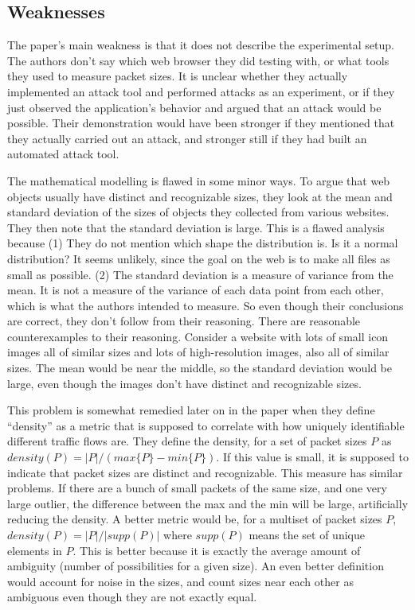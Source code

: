 \documentclass{acm_proc_article-sp}
\begin{document}
\subsection{Weaknesses}

The paper's main weakness is that it does not describe the experimental setup.
The authors don't say which web browser they did testing with, or what tools
they used to measure packet sizes. It is unclear whether they actually
implemented an attack tool and performed attacks as an experiment, or if they
just observed the application's behavior and argued that an attack would be
possible. Their demonstration would have been stronger if they mentioned that
they actually carried out an attack, and stronger still if they had built an
automated attack tool.

The mathematical modelling is flawed in some minor ways. To argue that web
objects usually have distinct and recognizable sizes, they look at the mean and
standard deviation of the sizes of objects they collected from various websites.
They then note that the standard deviation is large. This is a flawed analysis
because (1) They do not mention which shape the distribution is. Is it a normal
distribution? It seems unlikely, since the goal on the web is to make all files
as small as possible. (2) The standard deviation is a measure of variance from
the mean. It is not a measure of the variance of each data point from each
other, which is what the authors intended to measure. So even though their
conclusions are correct, they don't follow from their reasoning. There are
reasonable counterexamples to their reasoning. Consider a website with lots of
small icon images all of similar sizes and lots of high-resolution images, also
all of similar sizes. The mean would be near the middle, so the standard
deviation would be large, even though the images don't have distinct and
recognizable sizes.

This problem is somewhat remedied later on in the paper when they define
``density'' as a metric that is supposed to correlate with how uniquely
identifiable different traffic flows are. They define the density, for a set of
packet sizes $P$ as $density(P) = |P| / (max\{P\} - min\{P\})$. If this value is small, it is
supposed to indicate that packet sizes are distinct and recognizable. This
measure has similar problems. If there are a bunch of small packets of the same
size, and one very large outlier, the difference between the max and the min
will be large, artificially reducing the density. A better metric would be, for
a multiset of packet sizes $P$, $density(P) = |P| / |supp(P)|$ where $supp(P)$
means the set of unique elements in $P$. This is better because it is exactly
the average amount of ambiguity (number of possibilities for a given size). An
even better definition would account for noise in the sizes, and count sizes
near each other as ambiguous even though they are not exactly equal. 
\end{document}
